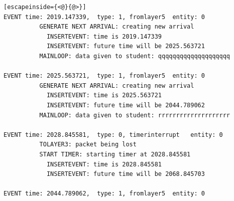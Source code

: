 \documentclass[paper=a4, fontsize=11pt]{scrartcl}
\numberwithin{equation}{section}		%
\numberwithin{figure}{section}			%
\numberwithin{table}{section}				%
\begin{document}
\begin{lstlisting}[escapeinside={<@}{@>}]
EVENT time: 2019.147339,  type: 1, fromlayer5  entity: 0
          GENERATE NEXT ARRIVAL: creating new arrival
            INSERTEVENT: time is 2019.147339
            INSERTEVENT: future time will be 2025.563721
          MAINLOOP: data given to student: qqqqqqqqqqqqqqqqqqqq

EVENT time: 2025.563721,  type: 1, fromlayer5  entity: 0
          GENERATE NEXT ARRIVAL: creating new arrival
            INSERTEVENT: time is 2025.563721
            INSERTEVENT: future time will be 2044.789062
          MAINLOOP: data given to student: rrrrrrrrrrrrrrrrrrrr

EVENT time: 2028.845581,  type: 0, timerinterrupt   entity: 0
          TOLAYER3: packet being lost
          START TIMER: starting timer at 2028.845581
            INSERTEVENT: time is 2028.845581
            INSERTEVENT: future time will be 2068.845703

EVENT time: 2044.789062,  type: 1, fromlayer5  entity: 0

\end{lstlisting}

\end{document}

